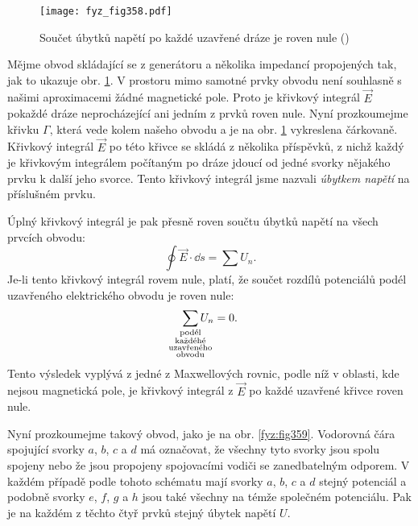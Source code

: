   \begin{figure}[ht!] %
    \centering
    \texttt{[image: fyz\_fig358.pdf]}
    \caption{Součet úbytků napětí po každé uzavřené dráze je roven nule
             (\cite[s.~399]{Feynman02})}
    \label{fyz:fig358}
  \end{figure}
  
  Mějme obvod skládající se z generátoru a několika impedancí propojených tak, jak to ukazuje obr. 
  \ref{fyz:fig358}. V prostoru mimo samotné prvky obvodu není souhlasně s našimi aproximacemi žádné 
  magnetické pole. Proto je křivkový integrál \(\vec{E}\) pokaždé dráze neprocházející ani jedním z 
  prvků roven nule. Nyní prozkoumejme křivku \(\Gamma\), která vede kolem našeho obvodu a je na 
  obr. \ref{fyz:fig358} vykreslena čárkovaně. Křivkový integrál \(\vec{E}\) po této křivce se 
  skládá z několika příspěvků, z nichž každý je křivkovým integrálem počítaným po dráze jdoucí od 
  jedné svorky nějakého prvku k další jeho svorce. Tento křivkový integrál jsme nazvali 
  \emph{úbytkem napětí} na příslušném prvku.
  
  Úplný křivkový integrál je pak přesně roven součtu úbytků napětí na všech prvcích obvodu: 
  \begin{equation}\label{fyz:eq482}
    \oint\vec{E}\cdot\dd{s} = \sum U_n.
  \end{equation}
  Je-li tento křivkový integrál rovem nule, platí, že součet rozdílů potenciálů podél uzavřeného 
  elektrického obvodu je roven nule:
  \begin{equation}\label{fyz:eq483}
    \sum_{\mathclap{\substack{\text{podél}\\\text{každéhé}\\\text{uzavřeného}\\\text{obvodu}}}} 
         U_n = 0.
  \end{equation}
  Tento výsledek vyplývá z jedné z Maxwellových rovnic, podle níž v oblasti, kde nejsou magnetická 
  pole, je křivkový integrál z \(\vec{E}\) po každé uzavřené křivce roven nule. 
  
  Nyní prozkoumejme takový obvod, jako je na obr. \ref{fyz:fig359}. Vodorovná čára spojující svorky 
  \(a\), \(b\), \(c\) a \(d\) má označovat, že všechny tyto svorky jsou spolu spojeny nebo že jsou 
  propojeny spojovacími vodiči se zanedbatelným odporem. V každém případě podle tohoto schématu 
  mají svorky \(a\), \(b\), \(c\) a \(d\) stejný potenciál a podobně svorky \(e\), \(f\), \(g\) a 
  \(h\) jsou také všechny na témže společném potenciálu. Pak je na každém z těchto čtyř prvků 
  stejný úbytek napětí \(U\).


